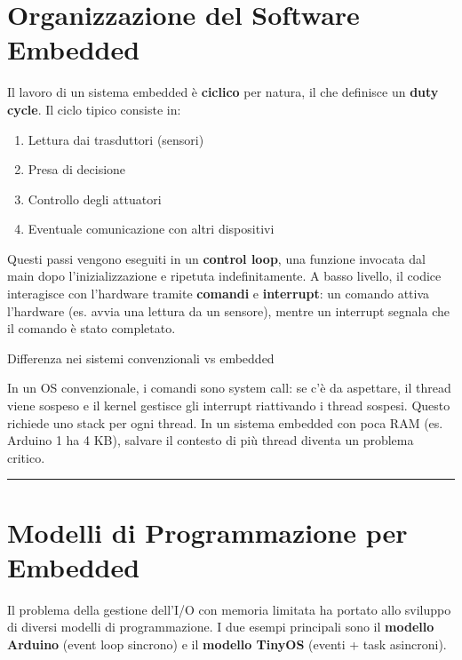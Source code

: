 \documentclass[
  italian,
  openany]{book}
\providecommand{\tightlist}{%
  \setlength{\itemsep}{0pt}\setlength{\parskip}{0pt}}
\begin{document}
\section{Organizzazione del Software
Embedded}\label{organizzazione-del-software-embedded}

Il lavoro di un sistema embedded è \textbf{ciclico} per natura, il che
definisce un \textbf{duty cycle}. Il ciclo tipico consiste in:

\begin{enumerate}
\def\labelenumi{\arabic{enumi}.}
\tightlist
\item
  Lettura dai trasduttori (sensori)
\item
  Presa di decisione
\item
  Controllo degli attuatori
\item
  Eventuale comunicazione con altri dispositivi
\end{enumerate}

Questi passi vengono eseguiti in un \textbf{control loop}, una funzione
invocata dal main dopo l'inizializzazione e ripetuta indefinitamente. A
basso livello, il codice interagisce con l'hardware tramite
\textbf{comandi} e \textbf{interrupt}: un comando attiva l'hardware (es.
avvia una lettura da un sensore), mentre un interrupt segnala che il
comando è stato completato.

\begin{callouttip}{Differenza nei sistemi convenzionali vs embedded}

In un OS convenzionale, i comandi sono system call: se c'è da aspettare,
il thread viene sospeso e il kernel gestisce gli interrupt riattivando i
thread sospesi. Questo richiede uno stack per ogni thread. In un sistema
embedded con poca RAM (es. Arduino 1 ha 4 KB), salvare il contesto di
più thread diventa un problema critico.

\end{callouttip}

\begin{center}\rule{0.5\linewidth}{0.5pt}\end{center}

\section{Modelli di Programmazione per
Embedded}\label{modelli-di-programmazione-per-embedded}

Il problema della gestione dell'I/O con memoria limitata ha portato allo
sviluppo di diversi modelli di programmazione. I due esempi principali
sono il \textbf{modello Arduino} (event loop sincrono) e il
\textbf{modello TinyOS} (eventi + task asincroni).
\end{document}

